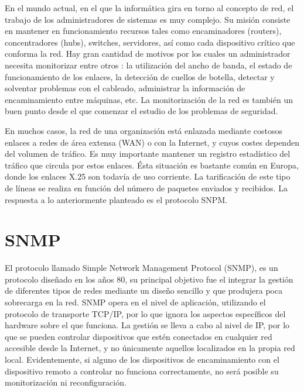\noindent
En el mundo actual, en el que la informática gira en torno al concepto de red, el trabajo de los administradores de sistemas es muy complejo. Su misión consiste en mantener en funcionamiento recursos tales como encaminadores (routers), concentradores (hubs), switches, servidores, así como cada dispositivo crítico que conforma la red. 
Hay gran cantidad de motivos por los cuales un administrador necesita monitorizar entre otros : la utilización del ancho de banda, el estado de funcionamiento de los enlaces, la detección de cuellos de botella, detectar y solventar problemas con el cableado, administrar la información de encaminamiento entre máquinas, etc. La monitorización de la red es también un buen punto desde el que comenzar el estudio de los problemas de seguridad.

\noindent
En muchos casos, la red de una organización está enlazada mediante costosos enlaces a redes de área extensa (WAN) o con la Internet, y cuyos costes dependen del volumen de tráfico. Es muy importante mantener un registro estadístico del tráfico que circula por estos enlaces. Ésta situación es bastante común en Europa, donde los enlaces X.25 son todavía de uso corriente. La tarificación de este tipo de líneas se realiza en función del número de paquetes enviados y recibidos. La respuesta a lo anteriormente planteado es el protocolo SNPM. \cite{intro_snmp}

\section{SNMP}

\noindent
El protocolo llamado Simple Network Management Protocol (SNMP), es un protocolo diseñado en los años 80, su principal objetivo fue el integrar la gestión de diferentes tipos de redes mediante un diseño sencillo y que produjera poca sobrecarga en la red.
SNMP opera en el nivel de aplicación, utilizando el protocolo de transporte TCP/IP, por lo que ignora los aspectos específicos del hardware sobre el que funciona. La gestión se lleva a cabo al nivel de IP, por lo que se pueden controlar dispositivos que estén conectados en cualquier red accesible desde la Internet, y no únicamente aquellos localizados en la propia red local. Evidentemente, si alguno de los dispositivos de encaminamiento con el dispositivo remoto a controlar no funciona correctamente, no será posible su monitorización ni reconfiguración.

